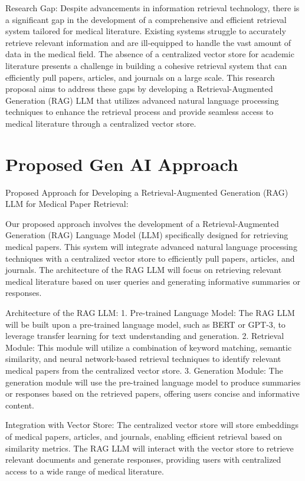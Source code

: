 \documentclass{article}
\begin{document}
Research Gap:
Despite advancements in information retrieval technology, there is a significant gap in the development of a comprehensive and efficient retrieval system tailored for medical literature. Existing systems struggle to accurately retrieve relevant information and are ill-equipped to handle the vast amount of data in the medical field. The absence of a centralized vector store for academic literature presents a challenge in building a cohesive retrieval system that can efficiently pull papers, articles, and journals on a large scale. This research proposal aims to address these gaps by developing a Retrieval-Augmented Generation (RAG) LLM that utilizes advanced natural language processing techniques to enhance the retrieval process and provide seamless access to medical literature through a centralized vector store.

\section*{Proposed Gen AI Approach}
Proposed Approach for Developing a Retrieval-Augmented Generation (RAG) LLM for Medical Paper Retrieval:

Our proposed approach involves the development of a Retrieval-Augmented Generation (RAG) Language Model (LLM) specifically designed for retrieving medical papers. This system will integrate advanced natural language processing techniques with a centralized vector store to efficiently pull papers, articles, and journals. The architecture of the RAG LLM will focus on retrieving relevant medical literature based on user queries and generating informative summaries or responses.

Architecture of the RAG LLM:
1. Pre-trained Language Model: The RAG LLM will be built upon a pre-trained language model, such as BERT or GPT-3, to leverage transfer learning for text understanding and generation.
2. Retrieval Module: This module will utilize a combination of keyword matching, semantic similarity, and neural network-based retrieval techniques to identify relevant medical papers from the centralized vector store.
3. Generation Module: The generation module will use the pre-trained language model to produce summaries or responses based on the retrieved papers, offering users concise and informative content.

Integration with Vector Store:
The centralized vector store will store embeddings of medical papers, articles, and journals, enabling efficient retrieval based on similarity metrics. The RAG LLM will interact with the vector store to retrieve relevant documents and generate responses, providing users with centralized access to a wide range of medical literature.
\end{document}
